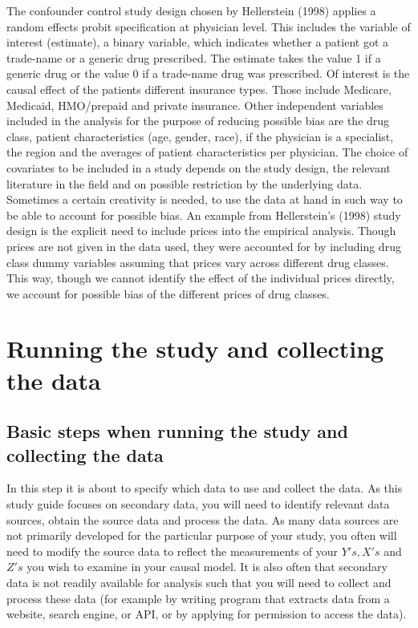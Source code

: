 \documentclass[
]{book}
\begin{document}
The confounder control study design chosen by Hellerstein (1998) applies
a random effects probit specification at physician level. This includes
the variable of interest (estimate), a binary variable, which indicates
whether a patient got a trade-name or a generic drug prescribed. The
estimate takes the value 1 if a generic drug or the value 0 if a
trade-name drug was prescribed. Of interest is the causal effect of the
patients different insurance types. Those include Medicare, Medicaid,
HMO/prepaid and private insurance. Other independent variables included
in the analysis for the purpose of reducing possible bias are the drug
class, patient characteristics (age, gender, race), if the physician is
a specialist, the region and the averages of patient characteristics per
physician. The choice of covariates to be included in a study depends on
the study design, the relevant literature in the field and on possible
restriction by the underlying data. Sometimes a certain creativity is
needed, to use the data at hand in such way to be able to account for
possible bias. An example from Hellerstein's (1998) study design is the
explicit need to include prices into the empirical analysis. Though
prices are not given in the data used, they were accounted for by
including drug class dummy variables assuming that prices vary across
different drug classes. This way, though we cannot identify the effect
of the individual prices directly, we account for possible bias of the
different prices of drug classes.

\hypertarget{run-study}{%
\chapter{Running the study and collecting the data}\label{run-study}}

\hypertarget{basic-steps-when-running-the-study-and-collecting-the-data}{%
\section{Basic steps when running the study and collecting the
data}\label{basic-steps-when-running-the-study-and-collecting-the-data}}

In this step it is about to specify which data to use and collect the
data. As this study guide focuses on secondary data, you will need to
identify relevant data sources, obtain the source data and process the
data. As many data sources are not primarily developed for the
particular purpose of your study, you often will need to modify the
source data to reflect the measurements of your \(Y's,X's\) and \(Z's\)
you wish to examine in your causal model. It is also often that
secondary data is not readily available for analysis such that you will
need to collect and process these data (for example by writing program
that extracts data from a website, search engine, or API, or by applying
for permission to access the data).
\end{document}
